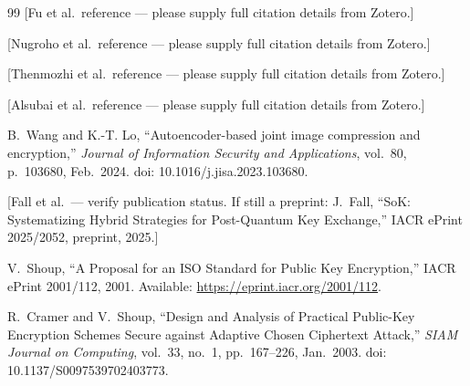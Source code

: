 \documentclass[twocolumn]{article}
\begin{document}
\begin{thebibliography}{99}
[Fu et al.\ reference --- please supply full citation details from Zotero.]

[Nugroho et al.\ reference --- please supply full citation details from Zotero.]

[Thenmozhi et al.\ reference --- please supply full citation details from Zotero.]

[Alsubai et al.\ reference --- please supply full citation details from Zotero.]

B.~Wang and K.-T. Lo,
``Autoencoder-based joint image compression and encryption,''
\textit{Journal of Information Security and Applications},
vol.~80, p.~103680, Feb.~2024.
doi: 10.1016/j.jisa.2023.103680.

[Fall et al.\ --- verify publication status. If still a preprint:
J.~Fall, ``SoK: Systematizing Hybrid Strategies for Post-Quantum Key Exchange,''
IACR ePrint 2025/2052, preprint, 2025.]

V.~Shoup,
``A Proposal for an ISO Standard for Public Key Encryption,''
IACR ePrint 2001/112, 2001.
Available: \url{https://eprint.iacr.org/2001/112}.

R.~Cramer and V.~Shoup,
``Design and Analysis of Practical Public-Key Encryption Schemes Secure against
Adaptive Chosen Ciphertext Attack,''
\textit{SIAM Journal on Computing},
vol.~33, no.~1, pp.~167--226, Jan.~2003.
doi: 10.1137/S0097539702403773.

\end{thebibliography}
\end{document}
